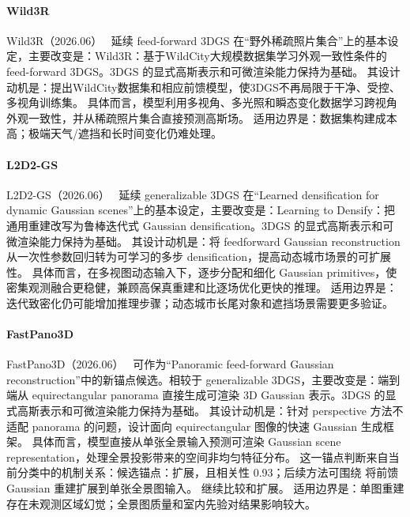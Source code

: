 \paragraph{Wild3R}
Wild3R（2026.06）~\cite{2606_11894} 延续 feed-forward 3DGS 在“野外稀疏照片集合”上的基本设定，主要改变是：Wild3R：基于WildCity大规模数据集学习外观一致性条件的feed-forward 3DGS。3DGS 的显式高斯表示和可微渲染能力保持为基础。
其设计动机是：提出WildCity数据集和相应前馈模型，使3DGS不再局限于干净、受控、多视角训练集。
具体而言，模型利用多视角、多光照和瞬态变化数据学习跨视角外观一致性，并从稀疏照片集合直接预测高斯场。
适用边界是：数据集构建成本高；极端天气/遮挡和长时间变化仍难处理。

\paragraph{L2D2-GS}
L2D2-GS（2026.06）~\cite{2606_29374} 延续 generalizable 3DGS 在“Learned densification for dynamic Gaussian scenes”上的基本设定，主要改变是：Learning to Densify：把通用重建改写为鲁棒迭代式 Gaussian densification。3DGS 的显式高斯表示和可微渲染能力保持为基础。
其设计动机是：将 feedforward Gaussian reconstruction 从一次性参数回归转为可学习的多步 densification，提高动态城市场景的可扩展性。
具体而言，在多视图动态输入下，逐步分配和细化 Gaussian primitives，使密集观测融合更稳健，兼顾高保真重建和比逐场优化更快的推理。
适用边界是：迭代致密化仍可能增加推理步骤；动态城市长尾对象和遮挡场景需要更多验证。

\paragraph{FastPano3D}
FastPano3D（2026.06）~\cite{2606_30352} 可作为“Panoramic feed-forward Gaussian reconstruction”中的新锚点候选。相较于 generalizable 3DGS，主要改变是：端到端从 equirectangular panorama 直接生成可渲染 3D Gaussian 表示。3DGS 的显式高斯表示和可微渲染能力保持为基础。
其设计动机是：针对 perspective 方法不适配 panorama 的问题，设计面向 equirectangular 图像的快速 Gaussian 生成框架。
具体而言，模型直接从单张全景输入预测可渲染 Gaussian scene representation，处理全景投影带来的空间非均匀特征分布。
这一锚点判断来自当前分类中的机制关系：候选锚点：扩展，且相关性 0.93；后续方法可围绕 将前馈 Gaussian 重建扩展到单张全景图输入。 继续比较和扩展。
适用边界是：单图重建存在未观测区域幻觉；全景图质量和室内先验对结果影响较大。

